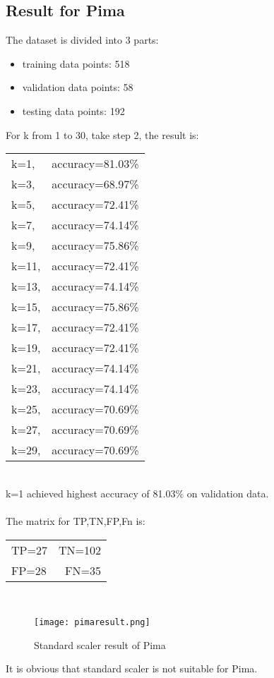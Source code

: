 \documentclass{article}
\begin{document}
\subsection{Result for Pima}
The dataset is divided into 3 parts:
\begin{itemize}
\item training data points: 518
\item validation data points: 58
\item testing data points: 192

\end{itemize}
For k from 1 to 30, take step 2, the result is:\\
\begin{tabular}{lr}
k=1, &accuracy=81.03\%\\
k=3, &accuracy=68.97\%\\
k=5, &accuracy=72.41\%\\
k=7, &accuracy=74.14\%\\
k=9, &accuracy=75.86\%\\
k=11,&accuracy=72.41\%\\
k=13,&accuracy=74.14\%\\
k=15,&accuracy=75.86\%\\
k=17,&accuracy=72.41\%\\
k=19, &accuracy=72.41\%\\
k=21, &accuracy=74.14\%\\
k=23, &accuracy=74.14\%\\
k=25, &accuracy=70.69\%\\
k=27, &accuracy=70.69\%\\
k=29, &accuracy=70.69\%
\end{tabular}\\
k=1 achieved highest accuracy of 81.03\% on validation data.\\
\\
The matrix for TP,TN,FP,Fn is:\\
\begin{tabular}{lr}
TP=27&TN=102\\
FP=28&FN=35
\end{tabular}\\

\begin{figure}[H]
\centering
\texttt{[image: pimaresult.png]}
\caption{Standard scaler result of Pima}
\label{fig4.1.1}

\end{figure}
It is obvious that standard scaler is not suitable for Pima.
\end{document}
